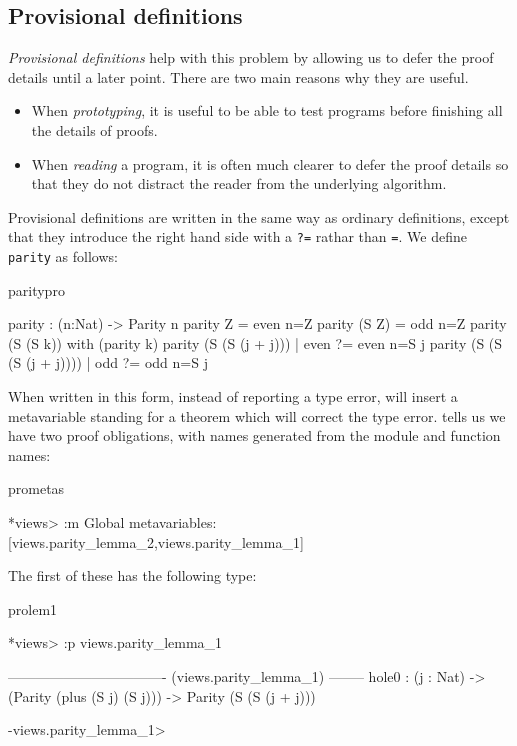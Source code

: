 \subsection{Provisional definitions}

\emph{Provisional definitions} help with this problem by allowing us to defer the
proof details until a later point. There are two main reasons why they are
useful.

\begin{itemize}
\item When \emph{prototyping}, it is useful to be able to test programs before
finishing all the details of proofs.  
\item When \emph{reading} a program, it is often much clearer to defer the proof
details so that they do not distract the reader from the underlying algorithm.
\end{itemize}

\noindent
Provisional definitions are written in the same way as ordinary definitions,
except that they introduce the right hand side with a \texttt{?=} rathar than
\texttt{=}. We define
\texttt{parity} as follows:

\begin{SaveVerbatim}{paritypro}

parity : (n:Nat) -> Parity n
parity Z     = even {n=Z}
parity (S Z) = odd {n=Z}
parity (S (S k)) with (parity k)
  parity (S (S (j + j)))     | even ?= even {n=S j}
  parity (S (S (S (j + j)))) | odd  ?= odd {n=S j}

\end{SaveVerbatim}

\noindent
When written in this form, instead of reporting a type error, \Idris{} will insert
a metavariable standing for a theorem which will correct the type error. \Idris{} 
tells us we have two proof obligations, with names generated from the module and
function names:

\begin{SaveVerbatim}{prometas}

*views> :m 
Global metavariables:
        [views.parity_lemma_2,views.parity_lemma_1]

\end{SaveVerbatim}

\noindent
The first of these has the following type:

\begin{SaveVerbatim}{prolem1}

*views> :p views.parity_lemma_1 

---------------------------------- (views.parity_lemma_1) --------
{hole0} : (j : Nat) -> (Parity (plus (S j) (S j))) -> Parity (S (S (j + j)))

-views.parity_lemma_1>  

\end{SaveVerbatim}

